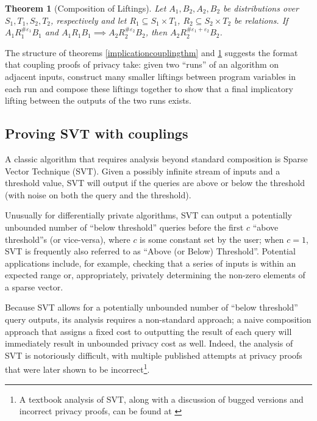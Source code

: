 \documentclass[12pt]{article}
\newtheorem{thm}{Theorem}[section]
\theoremstyle{definition}
\begin{document}
\begin{thm}[Composition of Liftings]\label{liftingcomposition}
    Let $A_1, B_2, A_2, B_2$ be distributions over $S_1, T_1, S_2, T_2$, respectively and let $R_1\subseteq S_1\times T_1$, $R_2\subseteq S_2\times T_2$ be relations. If $A_1 R_1^{\#\varepsilon_1}B_1$ and $A_1 R_1 B_1\implies A_2R_2^{\#\varepsilon_2}B_2$, then $A_2 R_2^{\#\varepsilon_1+\varepsilon_2}B_2$.
\end{thm}

The structure of theorems \ref{implicationcouplingthm} and \ref{liftingcomposition} suggests the format that coupling proofs of privacy take: given two ``runs'' of an algorithm on adjacent inputs, construct many smaller liftings between program variables in each run and compose these liftings together to show that a final implicatory lifting between the outputs of the two runs exists. 

\subsection{Proving SVT with couplings}

A classic algorithm that requires analysis beyond standard composition is Sparse Vector Technique (SVT). Given a possibly infinite stream of inputs and a threshold value, SVT will output if the queries are above or below the threshold (with noise on both the query and the threshold). 

Unusually for differentially private algorithms, SVT can output a potentially unbounded number of ``below threshold'' queries before the first $c$ ``above threshold''s (or vice-versa), where $c$ is some constant set by the user; when $c=1$, SVT is frequently also referred to as ``Above (or Below) Threshold''. Potential applications include, for example, checking that a series of inputs is within an expected range or, appropriately, privately determining the non-zero elements of a sparse vector. 

Because SVT allows for a potentially unbounded number of ``below threshold'' query outputs, its analysis requires a non-standard approach; a naive composition approach that assigns a fixed cost to outputting the result of each query will immediately result in unbounded privacy cost as well. 
Indeed, the analysis of SVT is notoriously difficult, with multiple published attempts at privacy proofs that were later shown to be incorrect\footnote{A textbook analysis of SVT, along with a discussion of bugged versions and incorrect privacy proofs, can be found at \cite{10.14778/3055330.3055331}}. 
\end{document}
